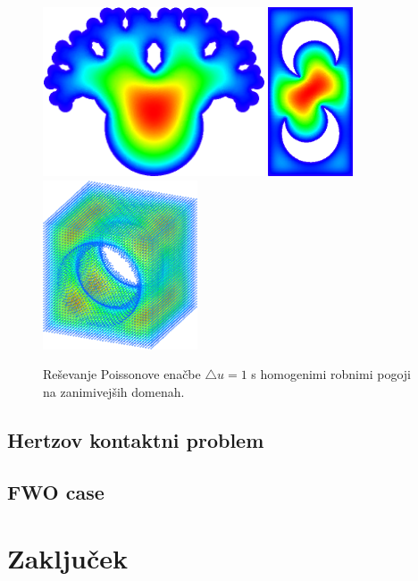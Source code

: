 \documentclass[12pt,a4paper]{article}
\theoremstyle{definition} %
\theoremstyle{plain} %
\numberwithin{equation}{section}
\begin{document}
\begin{figure}[h]
  \centering
  \includegraphics[height=5cm]{images/poisson_weird1.png}
  \hspace{10pt}
  \includegraphics[height=5cm]{images/poisson_weird2.png}
  \hspace{10pt}
  \includegraphics[height=5cm]{images/poisson_weird3.png}
  \caption{Reševanje Poissonove enačbe $\triangle u = 1$ s homogenimi robnimi pogoji na
  zanimivejših domenah.}
  \label{fig:poisson-square-weird}
\end{figure}

\subsection{Hertzov kontaktni problem}
\subsection{FWO case}

\section{Zaključek}

\clearpage


\end{document}
